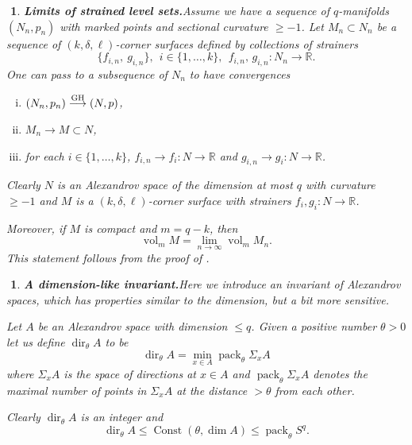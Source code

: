 \documentclass{article}
\def\RR{\mathbb{R}}
\def\ge{\geqslant}
\def\le{\leqslant}
\def\i{\subset}
\def\Const{\operatorname{Const}}
\def\vol{\operatorname{vol}}
\def\dim{\operatorname{dim}}
\def\dir{\operatorname{dir}}
\def\GHto{\buildrel \mathrm{GH} \over \longrightarrow}
\def\pack{\operatorname{pack}}
\newtheorem{Nothing}[thm]{$\!\!\!$}
\newenvironment{nothing}{\begin{Nothing}\rm}{\end{Nothing}}
\begin{document}
\begin{nothing}{\bf Limits of strained level sets.}\label{conv} Assume we have a sequence of $q$-manifolds $(N_n,p_n)$ with marked points and sectional curvature $\ge -1$.
Let $M_n\i N_n$ be a sequence of $(k,\delta,\ell)$-corner surfaces  defined by collections of strainers
$$\{f_{i,n},\ g_{i,n}\},\ \  i\in\{1,\dots,k\}, \ \ f_{i,n},\,g_{i,n}:N_n\to \RR.$$
One can pass to a subsequence of $N_n$ to have convergences
\begin{enumerate}[(i)]
\item $(N_n,p_n)\GHto (N,p)$,
\item $M_n\to M\i N$,
\item  for each $i\in \{1,\dots,k\}$, $f_{i,n}\to f_i:N\to \RR$ and $g_{i,n}\to g_i:N\to \RR$.
\end{enumerate}
Clearly $N$ is an Alexandrov space of the dimension at most $q$ with curvature $\ge -1$ and
$M$ is a $(k,\delta,\ell)$-corner surface with strainers $f_i,g_i:N\to \RR$.

Moreover, if $M$ is compact and $m=q-k$, then
$$\vol_m M=\lim_{n\to\infty}\vol_m M_n.$$
This statement follows from the proof of \cite[Th. 10.8]{BGP}.
\end{nothing}

\begin{nothing}{\bf A dimension-like invariant.}\label{dir}
Here we introduce an invariant of Alexandrov spaces,
which has properties similar to the dimension, but a bit more sensitive.

Let $A$ be an Alexandrov space with dimension $\le q$.
Given a positive number $\theta>0$ let us define $\dir_\theta A$ to be
$$\dir_\theta A=\min_{x\in A}\pack_\theta \Sigma_x A$$
where $\Sigma_x A$ is the space of directions at $x\in A$ and $\pack_\theta \Sigma_x A$
denotes the maximal number of points in $\Sigma_x A$ at the distance
$> \theta$ from each other.


Clearly $\dir_\theta A$ is an integer and
$$\dir_\theta A\le \Const(\theta,\dim A)\le \pack_\theta S^q.$$
\end{nothing}
\end{document}
